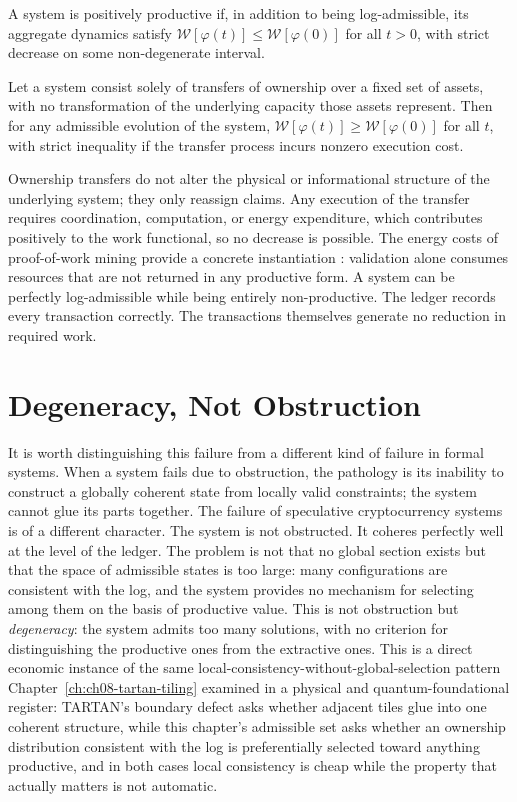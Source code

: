\begin{definition}
A system is positively productive if, in addition to being log-admissible, its aggregate dynamics satisfy $\mathcal{W}[\varphi(t)] \leq \mathcal{W}[\varphi(0)]$ for all $t > 0$, with strict decrease on some non-degenerate interval.
\end{definition}

\begin{proposition}
Let a system consist solely of transfers of ownership over a fixed set of assets, with no transformation of the underlying capacity those assets represent. Then for any admissible evolution of the system, $\mathcal{W}[\varphi(t)] \geq \mathcal{W}[\varphi(0)]$ for all $t$, with strict inequality if the transfer process incurs nonzero execution cost.
\end{proposition}

Ownership transfers do not alter the physical or informational structure of the underlying system; they only reassign claims. Any execution of the transfer requires coordination, computation, or energy expenditure, which contributes positively to the work functional, so no decrease is possible. The energy costs of proof-of-work mining provide a concrete instantiation \cite{devries2018,truby2018}: validation alone consumes resources that are not returned in any productive form. A system can be perfectly log-admissible while being entirely non-productive. The ledger records every transaction correctly. The transactions themselves generate no reduction in required work.

\section{Degeneracy, Not Obstruction}

It is worth distinguishing this failure from a different kind of failure in formal systems. When a system fails due to obstruction, the pathology is its inability to construct a globally coherent state from locally valid constraints; the system cannot glue its parts together. The failure of speculative cryptocurrency systems is of a different character. The system is not obstructed. It coheres perfectly well at the level of the ledger. The problem is not that no global section exists but that the space of admissible states is too large: many configurations are consistent with the log, and the system provides no mechanism for selecting among them on the basis of productive value. This is not obstruction but \emph{degeneracy}: the system admits too many solutions, with no criterion for distinguishing the productive ones from the extractive ones. This is a direct economic instance of the same local-consistency-without-global-selection pattern Chapter~\ref{ch:ch08-tartan-tiling} examined in a physical and quantum-foundational register: TARTAN's boundary defect asks whether adjacent tiles glue into one coherent structure, while this chapter's admissible set asks whether an ownership distribution consistent with the log is preferentially selected toward anything productive, and in both cases local consistency is cheap while the property that actually matters is not automatic.

